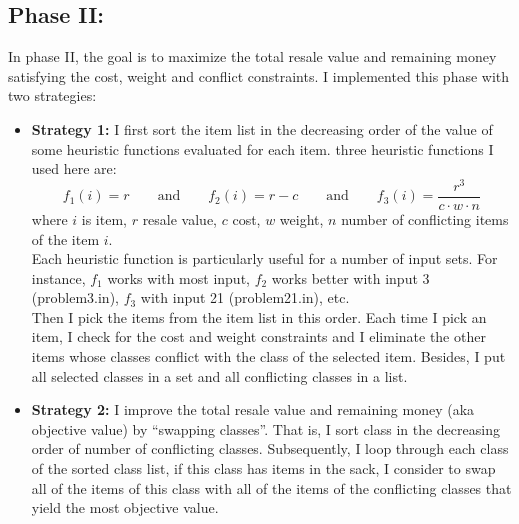 \documentclass[a4paper, 11pt]{article}
\begin{document}
	\subsection{Phase II:}
	In phase II, the goal is to maximize the total resale value and remaining money satisfying the cost, weight and conflict constraints. I implemented this phase with two strategies:
	\begin{itemize}
		\item \textbf{Strategy 1:} I first sort the item list in the decreasing order of the value of some heuristic functions evaluated for each item. three heuristic functions I used here are:
		\begin{equation*}
			f_1(i) = r \qquad \text{and} \qquad f_2(i) = r - c \qquad \text{and} \qquad f_3(i) = \frac{r^3}{c\cdot w\cdot n}
		\end{equation*}
		where $i$ is item, $r$ resale value, $c$ cost, $w$ weight, $n$ number of conflicting items of the item $i$.\\
		Each heuristic function is particularly useful for a number of input sets. For instance, $f_1$ works with most input, $f_2$ works better with input 3 (problem3.in), $f_3$ with input 21 (problem21.in), etc.\\
		Then I pick the items from the item list in this order. Each time I pick an item, I check for the cost and weight constraints and I eliminate the other items whose classes conflict with the class of the selected item. Besides, I put all selected classes in a set and all conflicting classes in a list.
		\item \textbf{Strategy 2:} I improve the total resale value and remaining money (aka objective value) by ``swapping classes''. That is, I sort class in the decreasing order of number of conflicting classes. Subsequently, I loop through each class of the sorted class list, if this class has items in the sack, I consider to swap all of the items of this class with all of the items of the conflicting classes that yield the most objective value. 
	\end{itemize}
		 
\end{document}
